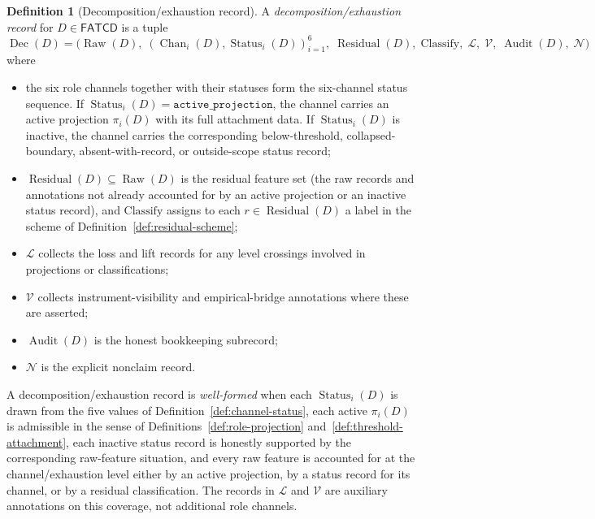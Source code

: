 \documentclass[11pt]{article}
\theoremstyle{definition}
\newtheorem{definition}[theorem]{Definition}
\newcommand{\FATCD}{\ensuremath{\mathsf{FATCD}}}
\newcommand{\Raw}[1]{\ensuremath{\operatorname{Raw}\!\left(#1\right)}}
\newcommand{\Audit}[1]{\ensuremath{\operatorname{Audit}\!\left(#1\right)}}
\newcommand{\Dec}[1]{\ensuremath{\operatorname{Dec}\!\left(#1\right)}}
\newcommand{\Residual}[1]{\ensuremath{\operatorname{Residual}\!\left(#1\right)}}
\newcommand{\Chan}[2]{\ensuremath{\operatorname{Chan}_{#1}\!\left(#2\right)}}
\newcommand{\Status}[2]{\ensuremath{\operatorname{Status}_{#1}\!\left(#2\right)}}
\newcommand{\activeproj}{\texttt{active\_projection}}
\begin{document}
\begin{definition}[Decomposition/exhaustion record]\label{def:decomposition-record}
A \emph{decomposition/exhaustion record} for \(D \in \FATCD{}\) is a tuple
\[
\Dec{D} = \bigl(\Raw{D},\; (\Chan{i}{D}, \Status{i}{D})_{i=1}^{6},\;
\Residual{D},\; \mathrm{Classify},\; \mathcal{L},\; \mathcal{V},\;
\Audit{D},\; \mathcal{N}\bigr)
\]
where
\begin{itemize}[topsep=2pt,itemsep=1pt]
  \item the six role channels together with their statuses form the
    six-channel status sequence. If \(\Status{i}{D} = \activeproj\), the channel
    carries an active projection \(\pi_i(D)\) with its full attachment
    data. If \(\Status{i}{D}\) is inactive, the channel carries the
    corresponding below-threshold, collapsed-boundary,
    absent-with-record, or outside-scope status record;
  \item \(\Residual{D} \subseteq \Raw{D}\) is the residual feature set
    (the raw records and annotations not already accounted for by an
    active projection or an inactive status record), and
    \(\mathrm{Classify}\) assigns to each \(r \in \Residual{D}\) a label
    in the scheme of Definition~\ref{def:residual-scheme};
  \item \(\mathcal{L}\) collects the loss and lift records for any level
    crossings involved in projections or classifications;
  \item \(\mathcal{V}\) collects instrument-visibility and
    empirical-bridge annotations where these are asserted;
  \item \(\Audit{D}\) is the honest bookkeeping subrecord;
  \item \(\mathcal{N}\) is the explicit nonclaim record.
\end{itemize}
A decomposition/exhaustion record is \emph{well-formed} when each
\(\Status{i}{D}\) is drawn from the five values of
Definition~\ref{def:channel-status}, each active
\(\pi_i(D)\) is admissible in the sense of
Definitions~\ref{def:role-projection} and~\ref{def:threshold-attachment},
each inactive status record is honestly supported by the corresponding
raw-feature situation, and every raw feature is accounted for at the
channel/exhaustion level either by an active projection, by a status
record for its channel, or by a residual classification. The records in
\(\mathcal{L}\) and \(\mathcal{V}\) are auxiliary annotations on this
coverage, not additional role channels.
\end{definition}
\end{document}
